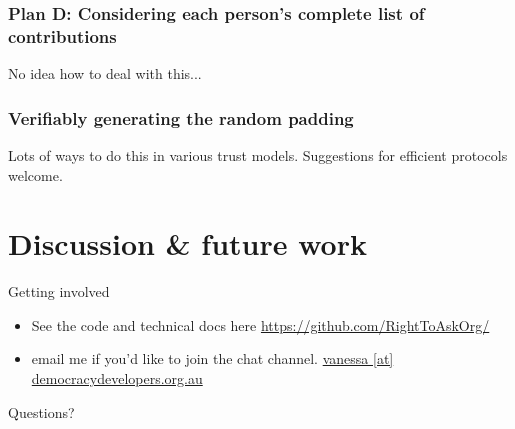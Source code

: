 \documentclass[10pt,xcolor=svgnames,169]{beamer} %
\begin{document}
\begin{frame}
	\frametitle{Plan D: Considering each person's complete list of contributions}
	No idea how to deal with this...
\end{frame}
			

\begin{frame}
	\frametitle{Verifiably generating the random padding}
	Lots of ways to do this in various trust models. Suggestions for efficient protocols welcome.
\end{frame}
			
	\section{Discussion \& future work}
	
\begin{frame}{Getting involved}
	
	\begin{itemize}
		\item See the code and technical docs here
	\url{https://github.com/RightToAskOrg/}
	\item email me if you'd like to join the chat channel.
	\url{vanessa [at] democracydevelopers.org.au}
	\end{itemize}
\end{frame}

	{ %
		\begin{frame}[standout]
			Questions? 
		\end{frame}
	}
	
	
\end{document}
